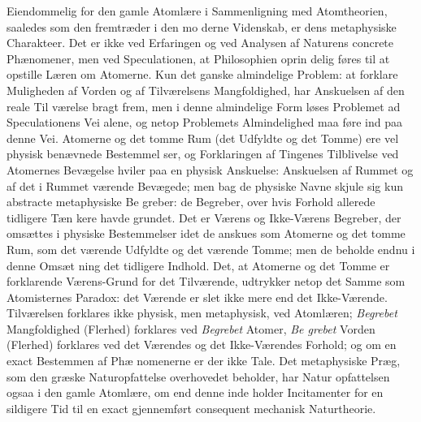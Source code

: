 \documentclass[12pt,a4paper]{book}
\begin{document}
Eiendommelig for den gamle Atomlære i Sammenligning
med Atomtheorien, saaledes som den fremtræder i den mo\-%
derne Videnskab, er dens metaphysiske Charakteer. Det er
ikke ved Erfaringen og ved Analysen af Naturens concrete
Phænomener, men ved Speculationen, at Philosophien oprin\-%
delig føres til at opstille Læren om Atomerne. Kun det ganske
almindelige Problem: at forklare Muligheden af Vorden og af
Tilværelsens Mangfoldighed, har Anskuelsen af den reale Til\-%
værelse bragt frem, men i denne almindelige Form løses Problemet
ad Speculationens Vei alene, og netop Problemets Almindelighed
maa føre ind paa denne Vei. Atomerne og det tomme Rum (det
Udfyldte og det Tomme) ere vel physisk benævnede Bestemmel\-%
ser, og Forklaringen af Tingenes Tilblivelse ved Atomernes
Bevægelse hviler paa en physisk Anskuelse: Anskuelsen af
Rummet og af det i Rummet værende Bevægede; men bag
de physiske Navne skjule sig kun abstracte metaphysiske Be\-%
greber: de Begreber, over hvis Forhold allerede tidligere Tæn\-%
kere havde grundet. Det er Værens og Ikke-Værens Begreber,
der omsættes i physiske Bestemmelser idet de anskues som
Atomerne og det tomme Rum, som det værende Udfyldte og
det værende Tomme; men de beholde endnu i denne Omsæt\-%
ning det tidligere Indhold. Det, at Atomerne og det Tomme
er forklarende Værens-Grund for det Tilværende, udtrykker
netop det Samme som Atomisternes Paradox: det Værende er
slet ikke mere end det Ikke-Værende. Tilværelsen forklares
ikke physisk, men metaphysisk, ved Atomlæren; \emph{Begrebet}
Mangfoldighed (Flerhed) forklares ved \emph{Begrebet} Atomer, \emph{Be\-%
grebet} Vorden (Flerhed) forklares ved det Værendes og det
Ikke-Værendes Forhold; og om en exact Bestemmen af Phæ\-%
nomenerne er der ikke Tale. Det metaphysiske Præg, som
den græske Naturopfattelse overhovedet beholder, har Natur\-%
opfattelsen ogsaa i den gamle Atomlære, om end denne inde\-%
holder Incitamenter for en sildigere Tid til en exact gjennemført
consequent mechanisk Naturtheorie.
\end{document}

